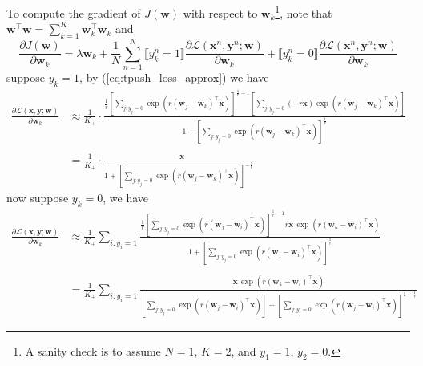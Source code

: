 \documentclass[9pt]{extarticle}
\newcommand{\llb}{\llbracket}
\newcommand{\rrb}{\rrbracket}
\newcommand{\x}{\mathbf{x}}
\newcommand{\y}{\mathbf{y}}
\newcommand{\1}{\mathbf{1}}
\newcommand{\w}{\mathbf{w}}
\newcommand{\LCal}{\mathcal{L}}
\begin{document}
To compute the gradient of $J(\w)$ with respect to $\w_k$\footnote{A sanity check is to assume $N=1, \, K=2$, and $y_1 = 1$, $y_2=0$.},
note that $\w^\top \w = \sum_{k=1}^K \w_k^\top \w_k$ and 
$$
\frac{\partial J(\w)} {\partial \w_k} 
= \lambda \w_k + \frac{1}{N} \sum_{n=1}^N 
  \llb y_k^n = 1 \rrb
  \frac{\partial \LCal(\x^n, \y^n; \w)} {\partial \w_k} + 
  \llb y_k^n = 0 \rrb
  \frac{\partial \LCal(\x^n, \y^n; \w)} {\partial \w_k}
$$
%
suppose $y_k = 1$, by (\ref{eq:tpush_loss_approx}) we have
\begin{equation}
\label{eq:grad_of_loss_pos}
\begin{aligned}
\frac{\partial \LCal(\x, \y; \w)} {\partial \w_k}
&\approx \frac{1}{K_+} \cdot
         \frac{ \frac{1}{r} \left[ \underset{j:y_j=0}{\sum} \exp \left(r (\w_j - \w_k)^\top \x \right) \right]^{\frac{1}{r} - 1} 
                \left[ \underset{j:y_j=0}{\sum} (-r \x)  \exp \left( r (\w_j - \w_k)^\top \x \right) \right] }
              { 1 + \left[ \underset{j:y_j=0}{\sum} \exp \left(r (\w_j - \w_k)^\top \x \right) \right]^{\frac{1}{r}} } \\ \\
&= \frac{1}{K_+} \cdot
   \frac{ -\x } { 1 + \left[ \underset{j:y_j=0}{\sum} \exp \left(r (\w_j - \w_k)^\top \x \right) \right]^{-\frac{1}{r}} }
\end{aligned}
\end{equation}
%
now suppose $y_k = 0$, we have
\begin{equation}
\label{eq:grad_of_loss_neg}
\begin{aligned}
\frac{\partial \LCal(\x, \y; \w)} {\partial \w_k}
&\approx \frac{1}{K_+} \sum_{i:y_i=1}
         \frac{ \frac{1}{r} \left[ \underset{j:y_j=0}{\sum} \exp \left(r (\w_j - \w_i)^\top \x \right) \right]^{\frac{1}{r} - 1} 
                r \x \, \exp \left( r (\w_k - \w_i)^\top \x \right) }
              { 1 + \left[ \underset{j:y_j=0}{\sum} \exp \left(r (\w_j - \w_i)^\top \x \right) \right]^{\frac{1}{r}} } \\ \\
&= \frac{1}{K_+} \sum_{i:y_i=1}
   \frac{ \x \, \exp \left( r (\w_k - \w_i)^\top \x \right) }
        { \left[ \underset{j:y_j=0}{\sum} \exp \left(r (\w_j - \w_i)^\top \x \right) \right] +
          \left[ \underset{j:y_j=0}{\sum} \exp \left(r (\w_j - \w_i)^\top \x \right) \right]^{1-\frac{1}{r}} }
\end{aligned}
\end{equation}
\end{document}
